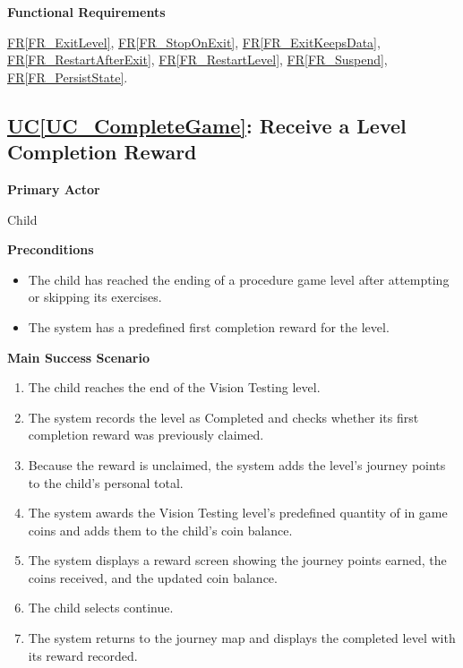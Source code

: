 \documentclass[12pt]{article}
\newcounter{ucnum} %
\newcommand{\ucref}[1]{\hyperref[#1]{UC\ref*{#1}}}
\newcommand{\rref}[1]{\hyperref[#1]{FR\ref*{#1}}}
\begin{document}
\textbf{Functional Requirements}

\rref{FR_ExitLevel}, \rref{FR_StopOnExit}, \rref{FR_ExitKeepsData}, \rref{FR_RestartAfterExit}, \rref{FR_RestartLevel}, \rref{FR_Suspend}, \rref{FR_PersistState}.

\label{UC_CompleteGame}
\subsection{\ucref{UC_CompleteGame}: Receive a Level Completion Reward}

\textbf{Primary Actor}

Child

\textbf{Preconditions}
\begin{itemize}
    \item The child has reached the ending of a procedure game level
    after attempting or skipping its exercises.
    \item The system has a predefined first completion reward for
    the level.
\end{itemize}

\textbf{Main Success Scenario}
\begin{enumerate}
    \item The child reaches the end of the Vision Testing level.
    \item The system records the level as Completed and checks
    whether its first completion reward was previously claimed.
    \item Because the reward is unclaimed, the system adds the
    level's journey points to the child's personal total.
    \item The system awards the Vision Testing level's predefined
    quantity of in game coins and adds them to the child's coin balance.
    \item The system displays a reward screen showing the journey
    points earned, the coins received, and the updated coin balance.
    \item The child selects continue.
    \item The system returns to the journey map and displays the
    completed level with its reward recorded.
\end{enumerate}
\end{document}

